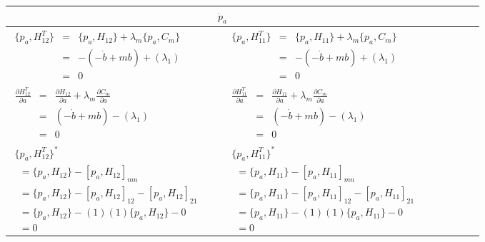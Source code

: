\documentclass[aps,preprint,preprintnumbers,nofootinbib,showpacs,prd]{revtex4-1}
\newcommand{\ba}{\begin{array}}
\newcommand{\ea}{\end{array}}
\begin{document}
\begin{center}
    \begin{tabular}{ | l | l |}
    \hline
    \multicolumn{2}{|c|}{$\dot p_a$} \\
    \hline
    $\ba {rcl}
\{p_a, H^T_{12}\} & = & \{p_a, H_{12}\} + \lambda_m \{p_a, C_m\} \\
& = & -(- \dot b + mb) + (\lambda_1) \\
& = & 0
\ea$
     &
    $\ba {rcl}
\{p_a, H^T_{11}\} & = & \{p_a, H_{11}\} + \lambda_m \{p_a, C_m\} \\
& = & -(- \dot b + mb) + (\lambda_1) \\
& = & 0
\ea$
      \\ \cline{1-2}
    $\ba {rcl}
\frac{\partial H^T_{12}}{\partial a} & = & \frac{\partial H_{12}}{\partial a} + \lambda_m \frac{\partial C_m}{\partial a} \\
& = & (- \dot b + mb) - (\lambda_1) \\
& = & 0
\ea$
      &
    $\ba {rcl}
\frac{\partial H^T_{11}}{\partial a} & = & \frac{\partial H_{11}}{\partial a} + \lambda_m \frac{\partial C_m}{\partial a} \\
& = & (- \dot b + mb) - (\lambda_1) \\
& = & 0
\ea$
      \\ \cline{1-2}
   $\ba {lcl}
\{p_a, H^T_{12}\}^* && \\
~~= \{p_a, H_{12}\} - [p_a, H_{12}]_{mn} && \\
~~= \{p_a, H_{12}\} - [p_a, H_{12}]_{12} - [p_a, H_{12}]_{21} && \\
~~= \{p_a, H_{12}\} -(1)(1)\{p_a, H_{12}\} - 0 && \\
~~= 0 &&
\ea$
   & 
   $\ba {lcl}
\{p_a, H^T_{11}\}^* && \\
~~= \{p_a, H_{11}\} - [p_a, H_{11}]_{mn} && \\
~~= \{p_a, H_{11}\} - [p_a, H_{11}]_{12} - [p_a, H_{11}]_{21} && \\
~~= \{p_a, H_{11}\} -(1)(1)\{p_a, H_{11}\} - 0 && \\
~~= 0 &&
   \ea$
     \\
    \hline
    \end{tabular}
\end{center}
\end{document}
